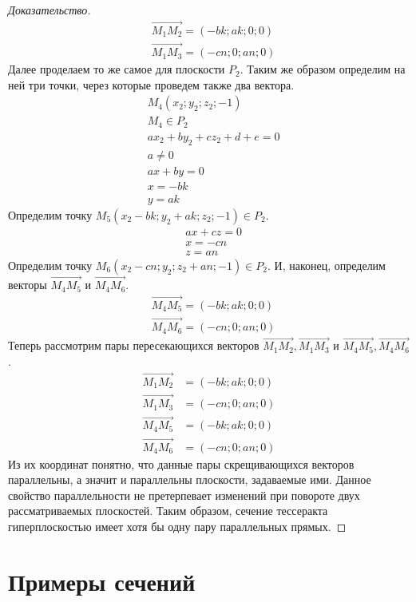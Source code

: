 \documentclass[12pt, a4paper, twoside]{report}
\begin{document}
\begin{proof}[Доказательство]
\begin{align*}
	&\vec{M_1M_2}=(-bk;ak;0;0) \\
	&\vec{M_1M_3}=(-cn;0;an;0) 
\end{align*}
Далее проделаем то же самое для плоскости $P_2$. Таким же образом определим на ней три точки, через которые проведем также два вектора.
\begin{align*}
	&M_4(x_2;y_2;z_2;-1) \\
 &M_4 \in P_2 \\
	&ax_2+by_2+cz_2+d+e=0 \\
	&a \ne0 \\
	&ax+by=0 \\
	&x=-bk \\
	&y=ak 
\end{align*}
Определим точку $M_5(x_2-bk;y_2+ak;z_2;-1) \in P_2$. 
\begin{align*}
	&ax+cz=0 \\
	&x=-cn \\
	&z=an
\end{align*}
Определим точку $M_6(x_2-cn;y_2;z_2+an;-1) \in P_2$. И, наконец, определим векторы $\vec{M_4M_5}$ и $\vec{M_4M_6}$.
\begin{align*}
	&\vec{M_4M_5}=(-bk;ak;0;0) \\
	&\vec{M_4M_6}=(-cn;0;an;0) 
\end{align*}
Теперь рассмотрим пары пересекающихся векторов $\vec{M_1M_2}, \vec{M_1M_3}$ и $\vec{M_4M_5}, \vec{M_4M_6}$.
\begin{align*}
	\vec{M_1M_2}&=(-bk;ak;0;0) \\
	\vec{M_1M_3}&=(-cn;0;an;0) \\
	\vec{M_4M_5}&=(-bk;ak;0;0) \\
	\vec{M_4M_6}&=(-cn;0;an;0)
\end{align*}
Из их координат понятно, что данные пары скрещивающихся векторов параллельны, а значит и параллельны плоскости, задаваемые ими. Данное свойство параллельности не претерпевает изменений при повороте двух рассматриваемых плоскостей. Таким образом, сечение тессеракта гиперплоскостью имеет хотя бы одну пару параллельных прямых.

\end{proof}

\section{Примеры сечений}
\end{document}
